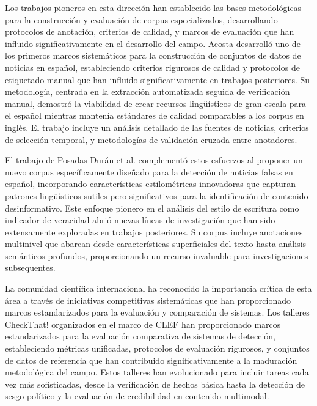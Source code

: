 Los trabajos pioneros en esta dirección han establecido las bases metodológicas para la construcción y evaluación de corpus especializados, desarrollando protocolos de anotación, criterios de calidad, y marcos de evaluación que han influido significativamente en el desarrollo del campo. Acosta \cite{acosta2019construccion} desarrolló uno de los primeros marcos sistemáticos para la construcción de conjuntos de datos de noticias en español, estableciendo criterios rigurosos de calidad y protocolos de etiquetado manual que han influido significativamente en trabajos posteriores. Su metodología, centrada en la extracción automatizada seguida de verificación manual, demostró la viabilidad de crear recursos lingüísticos de gran escala para el español mientras mantenía estándares de calidad comparables a los corpus en inglés. El trabajo incluye un análisis detallado de las fuentes de noticias, criterios de selección temporal, y metodologías de validación cruzada entre anotadores.

El trabajo de Posadas-Durán et al. \cite{posadas2019detection} complementó estos esfuerzos al proponer un nuevo corpus específicamente diseñado para la detección de noticias falsas en español, incorporando características estilométricas innovadoras que capturan patrones lingüísticos sutiles pero significativos para la identificación de contenido desinformativo. Este enfoque pionero en el análisis del estilo de escritura como indicador de veracidad abrió nuevas líneas de investigación que han sido extensamente exploradas en trabajos posteriores. Su corpus incluye anotaciones multinivel que abarcan desde características superficiales del texto hasta análisis semánticos profundos, proporcionando un recurso invaluable para investigaciones subsequentes.

La comunidad científica internacional ha reconocido la importancia crítica de esta área a través de iniciativas competitivas sistemáticas que han proporcionado marcos estandarizados para la evaluación y comparación de sistemas. Los talleres CheckThat! organizados en el marco de CLEF \cite{alam2023overview, barron2023clef} han proporcionado marcos estandarizados para la evaluación comparativa de sistemas de detección, estableciendo métricas unificadas, protocolos de evaluación rigurosos, y conjuntos de datos de referencia que han contribuido significativamente a la maduración metodológica del campo. Estos talleres han evolucionado para incluir tareas cada vez más sofisticadas, desde la verificación de hechos básica hasta la detección de sesgo político y la evaluación de credibilidad en contenido multimodal.

